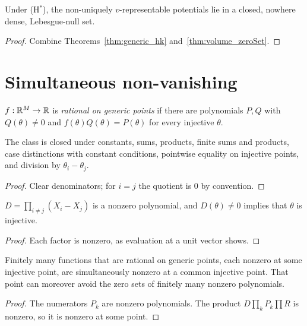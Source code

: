 \begin{theorem}
  \label{thm:generic_hk_ae}
  \leanok
  Under (H$^*$), the non-uniquely $v$-representable potentials lie in a closed, nowhere dense, Lebesgue-null set.
\end{theorem}
\begin{proof}
  \leanok
  Combine Theorems~\ref{thm:generic_hk} and~\ref{thm:volume_zeroSet}.
\end{proof}

\section{Simultaneous non-vanishing}

\begin{definition}
  \label{def:RatOn}
  \leanok
  $f:\mathbb{R}^M\to\mathbb{R}$ is \emph{rational on generic points} if there are polynomials $P,Q$ with $Q(\theta)\ne0$ and
  $f(\theta)Q(\theta)=P(\theta)$ for every injective $\theta$.
\end{definition}

\begin{lemma}
  \label{lem:RatOn_closure}
  \leanok
  The class is closed under constants, sums, products, finite sums and products, case distinctions with
  constant conditions, pointwise equality on injective points, and division by $\theta_i-\theta_j$.
\end{lemma}
\begin{proof}
  \leanok
  Clear denominators; for $i=j$ the quotient is $0$ by convention.
\end{proof}

\begin{lemma}[Discriminant]
  \label{lem:discPoly}
  \leanok
  $D=\prod_{i\neq j}(X_i-X_j)$ is a nonzero polynomial, and $D(\theta)\neq0$ implies that $\theta$ is injective.
\end{lemma}
\begin{proof}
  \leanok
  Each factor is nonzero, as evaluation at a unit vector shows.
\end{proof}

\begin{theorem}
  \label{thm:exists_common_ne}
  \leanok
  Finitely many functions that are rational on generic points, each nonzero at some injective point, are
  simultaneously nonzero at a common injective point. That point can moreover avoid the zero sets of
  finitely many nonzero polynomials.
\end{theorem}
\begin{proof}
  \leanok
  The numerators $P_k$ are nonzero polynomials. The product $D\prod_kP_k\prod R$ is nonzero, so it is
  nonzero at some point.
\end{proof}

